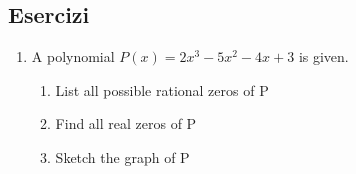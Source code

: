 \subsection{Esercizi}

\begin{enumerate}
\item A polynomial $P(x)=2x^3-5x^2-4x+3$ is given.
\begin{enumerate}
\item List all possible rational zeros of P
\item Find all real zeros of P
\item Sketch the graph of P
\end{enumerate}


\end{enumerate}
